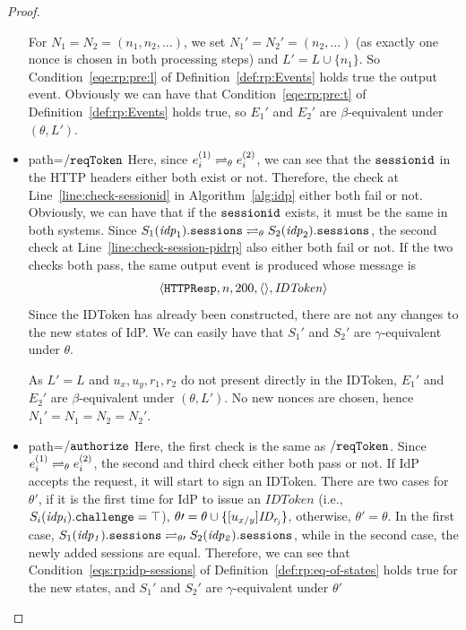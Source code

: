 \begin{proof}
\begin{itemize}
        For $N_1 = N_2 = (n_1, n_2, \dots)$, we set $N_1' = N_2' = (n_2, \dots)$ (as exactly one nonce is chosen in both processing steps) and $L' = L \cup \{n_1\}$. 
        So Condition~\ref{eqe:rp:pre:l} of Definition~\ref{def:rp:Events} holds true the output event.
        Obviously we can have that Condition~\ref{eqe:rp:pre:t} of Definition~\ref{def:rp:Events} holds true, so $E_1'$ and $E_2'$ are $\beta$-equivalent under $(\theta, L')$.
      \item path=$\mathtt{/reqToken}$ 
        Here, since $e_i^{(1)} \rightleftharpoons_{\theta} e_i^{(2)}$, 
        we can see that the $\mathtt{sessionid}$ in the HTTP headers either both exist or not.
        Therefore, the check at Line~\ref{line:check-sessionid} in Algorithm~\ref{alg:idp} either both fail or not. 
        Obviously, we can have that if the $\mathtt{sessionid}$ exists, it must be the same in both systems.
        Since $S_1(\mathit{idp}_1).\mathtt{sessions} \rightleftharpoons_{\theta} S_2(\mathit{idp}_2).\mathtt{sessions}$, 
        the second check at Line~\ref{line:check-session-pidrp} also either both fail or not.
        If the two checks both pass, the same output event is produced whose message is 
        \begin{align*}
          \langle {{}\mathtt{HTTPResp},n,200,\langle {{}} \rangle,\mathit{IDToken}} \rangle
        \end{align*}
        Since the IDToken has already been constructed, there are not any changes to the new states of IdP.
        We can easily have that $S_1\prime$ and $S_2\prime$ are $\gamma$-equivalent under $\theta$. 
        
        As $L' = L$ and $u_x, u_y, r_1, r_2$ do not present directly in the IDToken, $E_1'$ and $E_2'$ are $\beta$-equivalent under $(\theta, L')$.
        No new nonces are chosen, hence $N_1\prime=N_1=N_2=N_2\prime$.
      \item path=$\mathtt{/authorize}$ 
        Here, the first check is the same as $\mathtt{/reqToken}$.
        Since $e_i^{(1)} \rightleftharpoons_{\theta} e_i^{(2)}$, the second and third check either both pass or not.
        If IdP accepts the request, it will start to sign an IDToken.
        There are two cases for $\theta\prime$, if it is the first time for IdP to issue an $IDToken$ (i.e., $S_i(\mathit{idp_i}).\mathtt{challenge} = \top$), 
        $\theta\prime = \theta \cup \{ [u_{x/y}]\mathit{ID_{r_j}} \}$, otherwise, $\theta\prime = \theta$.
        In the first case, $S_1(\mathit{idp_1}).\mathtt{sessions} \rightleftharpoons_{\theta\prime} S_2(\mathit{idp_2}).\mathtt{sessions}$, 
        while in the second case, the newly added sessions are equal.
        Therefore, we can see that Condition~\ref{eqs:rp:idp-sessions} of Definition~\ref{def:rp:eq-of-states} holds true for the new states, 
        and $S_1\prime$ and $S_2\prime$ are $\gamma$-equivalent under $\theta\prime$


\end{itemize}
\end{proof}
